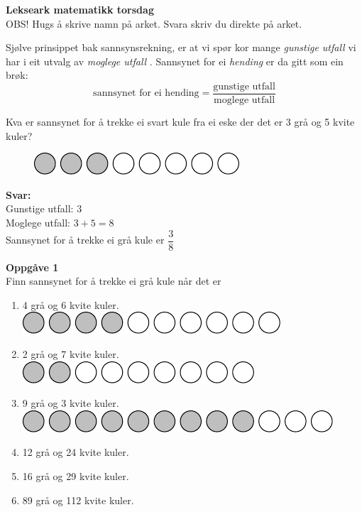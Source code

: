 \documentclass[english,hidelinks,pdftex, 11 pt, class=report,crop=false]{standalone}
\begin{document}
\huge \textbf{Lekseark matematikk torsdag}\\
\footnotesize OBS! Hugs å skrive namn på arket. Svara skriv du direkte på arket. \\[25pt]
\large


\begin{tcolorbox}[title=Sannsynsrekning,colback=white]
	Sjølve prinsippet bak sannsynsrekning, er at vi spør kor mange \textit{gunstige utfall}  vi har i eit utvalg av \textit{moglege utfall} . Sannsynet for ei \textit{hending} er da gitt som ein brøk:
	\[ 	\text{sannsynet for ei hending}=\frac{\text{gunstige utfall}}{\text{moglege utfall}} \]
\end{tcolorbox}
\begin{tcolorbox}[title=Eksempel,colback=white]
Kva er sannsynet for å trekke ei svart kule fra ei eske der det er 3 grå og 5 kvite kuler?
\begin{figure}
	\includegraphics[]{sanek1}
\end{figure}
\textbf{Svar:} \\[5pt]
Gunstige utfall: $ 3 $\\
Moglege utfall: $ 3+5=8 $\\
Sannsynet for å trekke ei grå kule er $ \dfrac{3}{8} $
\end{tcolorbox} \vspace{20pt}

{\Large \textbf{Oppgåve 1}}\\[10pt]
Finn sannsynet for å trekke ei grå kule når det er
\begin{enumerate}[label=\alph*)]
	\item 4 grå og 6 kvite kuler.\\
	\includegraphics[]{sanopg1a}
	\item 2 grå og 7 kvite kuler.\\
\includegraphics[]{sanopg1b}
	\item 9 grå og 3 kvite kuler.\\
\includegraphics[]{sanopg1c}
\item 12 grå og 24 kvite kuler.
\item 16 grå og 29 kvite kuler.
\item 89 grå og 112 kvite kuler.	
\end{enumerate} \vspace{20pt}
\end{document}

